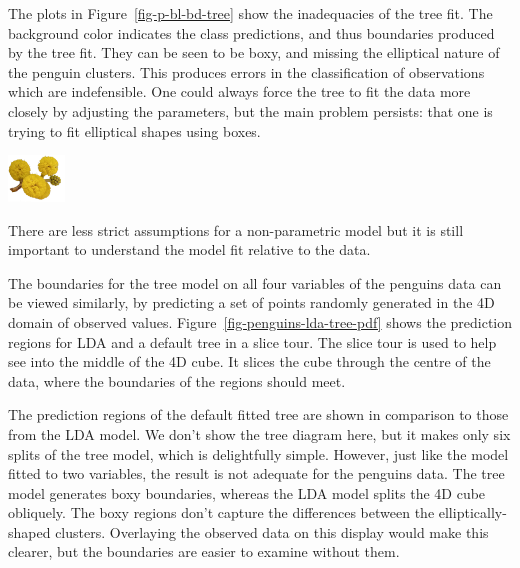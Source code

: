 \documentclass[
  letterpaper,
]{krantz}
\newcommand{\infobox}[1]{%
\noindent\colorbox{info!30}{%
\begin{minipage}{0.98\linewidth}%
    \centering%
    \begin{minipage}[c]{0.15\linewidth} %
      \includegraphics[width=1.5cm]{images/mulga-flowers2.png} %
    \end{minipage}%
    \hfill %
    \begin{minipage}[c]{0.8\linewidth} %
      \bigskip%
      \textsf{#1}%
      \bigskip%
    \end{minipage}%
    \hspace*{3mm}%
  \end{minipage}%
}%
}
\begin{document}
The plots in Figure~\ref{fig-p-bl-bd-tree} show the inadequacies of the
tree fit. The background color indicates the class predictions, and thus
boundaries produced by the tree fit. They can be seen to be boxy, and
missing the elliptical nature of the penguin clusters. This produces
errors in the classification of observations which are indefensible. One
could always force the tree to fit the data more closely by adjusting
the parameters, but the main problem persists: that one is trying to fit
elliptical shapes using boxes.

\infobox{There are less strict assumptions for a non-parametric model but it is still important to understand the model fit relative to the data. 
}

The boundaries for the tree model on all four variables of the penguins
data can be viewed similarly, by predicting a set of points randomly
generated in the 4D domain of observed values.
Figure~\ref{fig-penguins-lda-tree-pdf} shows the prediction regions for
LDA and a default tree in a slice tour. The slice tour is used to help
see into the middle of the 4D cube. It slices the cube through the
centre of the data, where the boundaries of the regions should meet.

The prediction regions of the default fitted tree are shown in
comparison to those from the LDA model. We don't show the tree diagram
here, but it makes only six splits of the tree model, which is
delightfully simple. However, just like the model fitted to two
variables, the result is not adequate for the penguins data. The tree
model generates boxy boundaries, whereas the LDA model splits the 4D
cube obliquely. The boxy regions don't capture the differences between
the elliptically-shaped clusters. Overlaying the observed data on this
display would make this clearer, but the boundaries are easier to
examine without them.

\end{document}

